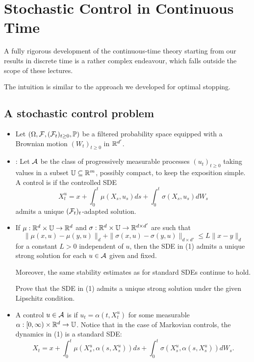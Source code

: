 \section{Stochastic Control in Continuous Time}

\begin{remark*}
    A fully rigorous development of the continuous-time theory starting from our results in discrete time is a rather complex endeavour, which falls outside the scope of these lectures.
    
    The intuition is similar to the approach we developed for optimal stopping.
\end{remark*}

\subsection{A stochastic control problem}

\begin{itemize}
    \item Let $(\Omega, \mathcal{F}, (\mathcal{F}_t)_{t \geq 0}, \mathbb P)$ be a filtered probability space equipped with a Brownian motion $(W_t)_{t \geq 0}$ in $\mathbb R^{d'}$.
    
    \item {}: Let $\mathcal{A}$ be the class of progressively measurable processes $(u_t)_{t \geq 0}$ taking values in a subset $\mathbb{U} \subseteq \mathbb R^m$, possibly compact, to keep the exposition simple. A control is  if the controlled SDE
    \begin{equation}
        X_t^u = x + \int_0^t \mu(X_s, u_s) ds + \int_0^t \sigma(X_s, u_s) dW_s
    \end{equation}
    admits a unique $(\mathcal{F}_t)_t$-adapted solution.
    
    \item If $\mu: \mathbb R^d \times \mathbb{U} \to \mathbb R^d$ and $\sigma: \mathbb R^d \times \mathbb{U} \to \mathbb R^{d \times d'}$ are such that
    \[ \|\mu(x,u) - \mu(y,u)\|_d + \|\sigma(x,u) - \sigma(y,u)\|_{d \times d'} \leq L \|x - y\|_d \]
    for a constant $L > 0$ independent of $u$, then the SDE in (1) admits a unique strong solution for each $u \in \mathcal{A}$ given and fixed.
    
    \begin{remark}
        Moreover, the same stability estimates as for standard SDEs continue to hold.
    \end{remark}
    
    \begin{homework*}[Advanced]
        Prove that the SDE in (1) admits a unique strong solution under the given Lipschitz condition.
    \end{homework*}
    
    \item A control $u \in \mathcal{A}$ is  if $u_t = \alpha(t, X_t^u)$ for some measurable $\alpha: [0, \infty) \times \mathbb R^d \to \mathbb{U}$. Notice that in the case of Markovian controls, the dynamics in (1) is a standard SDE:
    \[ X_t = x + \int_0^t \mu(X_s^u, \alpha(s, X_s^u)) ds + \int_0^t \sigma(X_s^u, \alpha(s, X_s^u)) dW_s. \]
\end{itemize}


